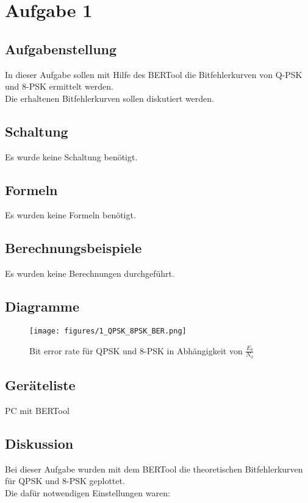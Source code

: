 \documentclass[12pt,a4paper,ngerman]{article}
\begin{document}


%
%

\section{Aufgabe 1}
\subsection{Aufgabenstellung}
In dieser Aufgabe sollen mit Hilfe des BERTool die Bitfehlerkurven von Q-PSK und 8-PSK ermittelt werden. \\
Die erhaltenen Bitfehlerkurven sollen diskutiert werden. \\

\subsection{Schaltung}
Es wurde keine Schaltung benötigt.

\subsection{Formeln}
Es wurden keine Formeln benötigt.

\subsection{Berechnungsbeispiele}
Es wurden keine Berechnungen durchgeführt.
\pagebreak
\subsection{Diagramme}
\begin{figure}[h!]
\centering
\texttt{[image: figures/1\_QPSK\_8PSK\_BER.png]} 
\caption{Bit error rate für QPSK und 8-PSK in Abhängigkeit von $\frac{E_b}{N_0}$}
	\label{fig:qpsk_8psk_ber}
	\end{figure}
	
\pagebreak	

\subsection{Geräteliste}
PC mit BERTool

\subsection{Diskussion}
Bei dieser Aufgabe wurden mit dem BERTool die theoretischen Bitfehlerkurven für QPSK und 8-PSK geplottet. \\
Die dafür notwendigen Einstellungen waren: \\
\end{document}
